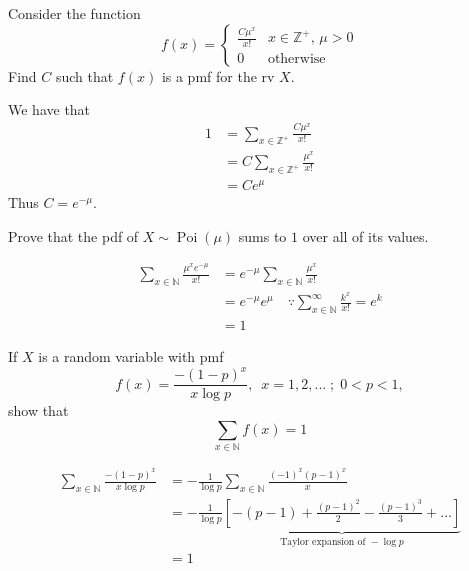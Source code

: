 \documentclass[notoc,notitlepage]{tufte-book}
\DeclareMathOperator{\Poi}{Poi }
\begin{document}
\begin{eg}
  Consider the function
  \begin{equation*}
    f(x) = \begin{cases}
      \frac{C \mu^x}{x!} & x \in \mathbb{Z}^+, \, \mu > 0 \\
      0                  & \text{otherwise}
    \end{cases}
  \end{equation*}
  Find $C$ such that $f(x)$ is a pmf for the rv $X$.

  \begin{solution}
    We have that
    \begin{align*}
      1 &= \sum_{x \in \mathbb{Z}^+} \frac{C \mu^x}{x!} \\
        &= C \sum_{x \in \mathbb{Z}^+} \frac{\mu^x}{x!} \\
        &= C e^\mu
    \end{align*}
    Thus $C = e^{- \mu}$.
  \end{solution}
\end{eg}

\begin{ex}
  Prove that the pdf of $X \sim \Poi(\mu)$ sums to $1$ over all of its values.

  \begin{solution}
    \begin{align*}
      \sum_{x \in \mathbb{N}} \frac{\mu^x e^{- \mu}}{x!}
        &= e^{- \mu} \sum_{x \in \mathbb{N}} \frac{\mu^x}{x!} \\
        &= e^{- \mu} e^\mu \quad \because \sum_{x \in \mathbb{N}}^{\infty} \frac{k^x}{x!} = e^k \\
        &= 1
    \end{align*}
  \end{solution}
\end{ex}

\begin{ex}
  If $X$ is a random variable with pmf
  \begin{equation*}
    f(x) = \frac{- (1 - p)^x}{x \log p}, \enspace x = 1, 2, ... \; ; \; 0 < p < 1,
  \end{equation*}
  show that
  \begin{equation*}
    \sum_{x \in \mathbb{N}} f(x) = 1
  \end{equation*}

  \begin{solution}
    \begin{align*}
      \sum_{x \in \mathbb{N}} \frac{- (1 - p)^x}{x \log p}
        &= - \frac{1}{\log p} \sum_{x \in \mathbb{N}} \frac{(-1)^x (p - 1)^x}{x} \\
        &= - \frac{1}{\log p} \underbrace{ \left[ - (p - 1) + \frac{(p - 1)^2}{2} - \frac{(p - 1)^3}{3} + \hdots \right] }_{\text{Taylor expansion of } - \log p} \\
        &= 1
    \end{align*}
  \end{solution}
\end{ex}
\end{document}

